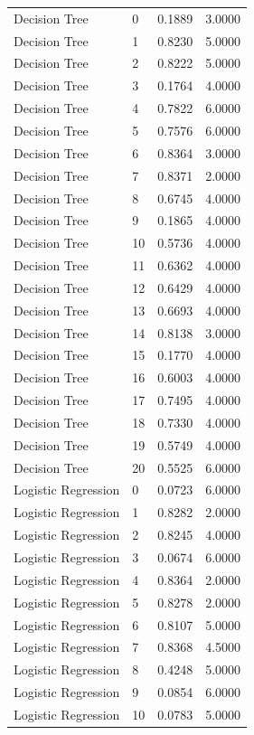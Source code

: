 \begin{tabular}{llll}
Decision Tree & 0 & 0.1889 & 3.0000 \\
Decision Tree & 1 & 0.8230 & 5.0000 \\
Decision Tree & 2 & 0.8222 & 5.0000 \\
Decision Tree & 3 & 0.1764 & 4.0000 \\
Decision Tree & 4 & 0.7822 & 6.0000 \\
Decision Tree & 5 & 0.7576 & 6.0000 \\
Decision Tree & 6 & 0.8364 & 3.0000 \\
Decision Tree & 7 & 0.8371 & 2.0000 \\
Decision Tree & 8 & 0.6745 & 4.0000 \\
Decision Tree & 9 & 0.1865 & 4.0000 \\
Decision Tree & 10 & 0.5736 & 4.0000 \\
Decision Tree & 11 & 0.6362 & 4.0000 \\
Decision Tree & 12 & 0.6429 & 4.0000 \\
Decision Tree & 13 & 0.6693 & 4.0000 \\
Decision Tree & 14 & 0.8138 & 3.0000 \\
Decision Tree & 15 & 0.1770 & 4.0000 \\
Decision Tree & 16 & 0.6003 & 4.0000 \\
Decision Tree & 17 & 0.7495 & 4.0000 \\
Decision Tree & 18 & 0.7330 & 4.0000 \\
Decision Tree & 19 & 0.5749 & 4.0000 \\
Decision Tree & 20 & 0.5525 & 6.0000 \\
Logistic Regression & 0 & 0.0723 & 6.0000 \\
Logistic Regression & 1 & 0.8282 & 2.0000 \\
Logistic Regression & 2 & 0.8245 & 4.0000 \\
Logistic Regression & 3 & 0.0674 & 6.0000 \\
Logistic Regression & 4 & 0.8364 & 2.0000 \\
Logistic Regression & 5 & 0.8278 & 2.0000 \\
Logistic Regression & 6 & 0.8107 & 5.0000 \\
Logistic Regression & 7 & 0.8368 & 4.5000 \\
Logistic Regression & 8 & 0.4248 & 5.0000 \\
Logistic Regression & 9 & 0.0854 & 6.0000 \\
Logistic Regression & 10 & 0.0783 & 5.0000 \\

\end{tabular}
